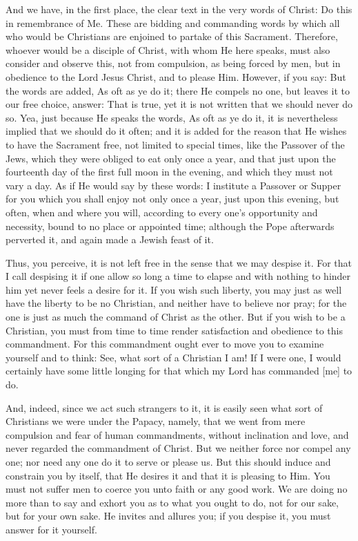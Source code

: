 And we have, in the first place, the clear text in the very words of
Christ: Do this in remembrance of Me. These are bidding and commanding
words by which all who would be Christians are enjoined to partake of
this Sacrament. Therefore, whoever would be a disciple of Christ, with
whom He here speaks, must also consider and observe this, not from
compulsion, as being forced by men, but in obedience to the Lord Jesus
Christ, and to please Him. However, if you say: But the words are
added, As oft as ye do it; there He compels no one, but leaves it to
our free choice, answer: That is true, yet it is not written that we
should never do so. Yea, just because He speaks the words, As oft as ye
do it, it is nevertheless implied that we should do it often; and it is
added for the reason that He wishes to have the Sacrament free, not
limited to special times, like the Passover of the Jews, which they
were obliged to eat only once a year, and that just upon the fourteenth
day of the first full moon in the evening, and which they must not vary
a day. As if He would say by these words: I institute a Passover or
Supper for you which you shall enjoy not only once a year, just upon
this evening, but often, when and where you will, according to every
one's opportunity and necessity, bound to no place or appointed time;
although the Pope afterwards perverted it, and again made a Jewish
feast of it.

Thus, you perceive, it is not left free in the sense that we may
despise it. For that I call despising it if one allow so long a time to
elapse and with nothing to hinder him yet never feels a desire for it.
If you wish such liberty, you may just as well have the liberty to be
no Christian, and neither have to believe nor pray; for the one is just
as much the command of Christ as the other. But if you wish to be a
Christian, you must from time to time render satisfaction and obedience
to this commandment. For this commandment ought ever to move you to
examine yourself and to think: See, what sort of a Christian I am! If I
were one, I would certainly have some little longing for that which my
Lord has commanded [me] to do.

And, indeed, since we act such strangers to it, it is easily seen what
sort of Christians we were under the Papacy, namely, that we went from
mere compulsion and fear of human commandments, without inclination and
love, and never regarded the commandment of Christ. But we neither
force nor compel any one; nor need any one do it to serve or please us.
But this should induce and constrain you by itself, that He desires it
and that it is pleasing to Him. You must not suffer men to coerce you
unto faith or any good work. We are doing no more than to say and
exhort you as to what you ought to do, not for our sake, but for your
own sake. He invites and allures you; if you despise it, you must
answer for it yourself.

